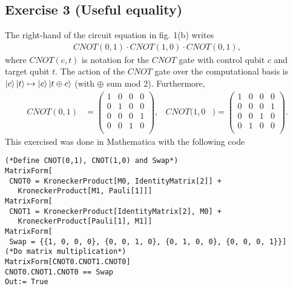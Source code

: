 \subsection{Exercise 3 (Useful equality)}\noindent
The right-hand of the circuit equation in fig. 1(b) writes
\begin{align}
CNOT(0,1)\cdot CNOT(1,0)\cdot CNOT(0,1),
\end{align}
where $CNOT(c,t)$ is notation for the $CNOT$ gate with control qubit $c$
and target qubit $t$. The action of the $CNOT$ gate over the computational 
basis is $\ket{c}\ket{t}\mapsto\ket{c}\ket{t\oplus c}$ (with $\oplus$ sum
mod 2). Furthermore,
\begin{align}
CNOT(0,1)&=
\left(
\begin{array}{cccc}
 1 & 0 & 0 & 0 \\
 0 & 1 & 0 & 0 \\
 0 & 0 & 0 & 1 \\
 0 & 0 & 1 & 0 \\
\end{array}
\right),&
CNOT(1,0&)=
\left(
\begin{array}{cccc}
 1 & 0 & 0 & 0 \\
 0 & 0 & 0 & 1 \\
 0 & 0 & 1 & 0 \\
 0 & 1 & 0 & 0 \\
\end{array}
\right).
\end{align}
This exercised was done in Mathematica with the following code
\begin{verbatim}
(*Define CNOT(0,1), CNOT(1,0) and Swap*)
MatrixForm[
 CNOT0 = KroneckerProduct[M0, IdentityMatrix[2]] + 
   KroneckerProduct[M1, Pauli[1]]]
MatrixForm[
 CNOT1 = KroneckerProduct[IdentityMatrix[2], M0] + 
   KroneckerProduct[Pauli[1], M1]]
MatrixForm[
 Swap = {{1, 0, 0, 0}, {0, 0, 1, 0}, {0, 1, 0, 0}, {0, 0, 0, 1}}]
(*Do matrix multiplication*)
MatrixForm[CNOT0.CNOT1.CNOT0]
CNOT0.CNOT1.CNOT0 == Swap
Out:= True
\end{verbatim}

